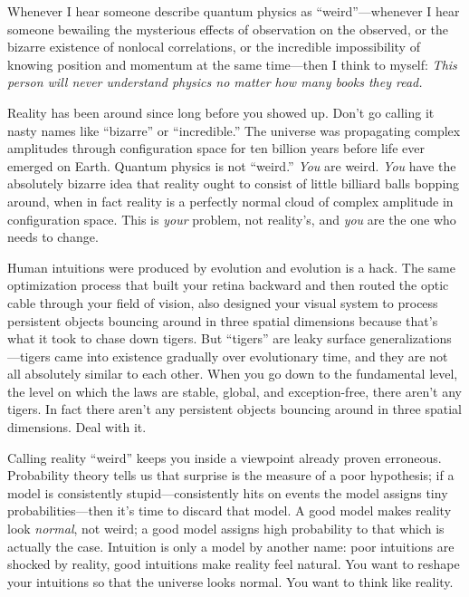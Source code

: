 \myendsectiontext


{
 Whenever I hear someone describe quantum physics as
``weird''---whenever I hear someone
bewailing the mysterious effects of observation on the observed, or the
bizarre existence of nonlocal correlations, or the incredible
impossibility of knowing position and momentum at the same time---then
I think to myself: \textit{This person will never understand physics no
matter how many books they read.} }

{
 Reality has been around since long before you showed up.
Don't go calling it nasty names like
``bizarre'' or
``incredible.'' The universe was
propagating complex amplitudes through configuration space for ten
billion years before life ever emerged on Earth. Quantum physics is not
``weird.'' \textit{You} are weird.
\textit{You} have the absolutely bizarre idea that reality ought to
consist of little billiard balls bopping around, when in fact reality
is a perfectly normal cloud of complex amplitude in configuration
space. This is \textit{your} problem, not reality's,
and \textit{you} are the one who needs to change.}

{
 Human intuitions were produced by evolution and evolution is a
hack. The same optimization process that built your retina backward and
then routed the optic cable through your field of vision, also designed
your visual system to process persistent objects bouncing around in
three spatial dimensions because that's what it took to
chase down tigers. But ``tigers''
are leaky surface generalizations---tigers came into existence
gradually over evolutionary time, and they are not all absolutely
similar to each other. When you go down to the fundamental level, the
level on which the laws are stable, global, and exception-free, there
aren't any tigers. In fact there aren't
any persistent objects bouncing around in three spatial dimensions.
Deal with it.}

{
 Calling reality ``weird'' keeps
you inside a viewpoint already proven erroneous. Probability theory
tells us that surprise is the measure of a poor hypothesis; if a model
is consistently stupid---consistently hits on events the model assigns
tiny probabilities---then it's time to discard that
model. A good model makes reality look \textit{normal}, not weird; a
good model assigns high probability to that which is actually the case.
Intuition is only a model by another name: poor intuitions are shocked
by reality, good intuitions make reality feel natural. You want to
reshape your intuitions so that the universe looks normal. You want to
think like reality.}


